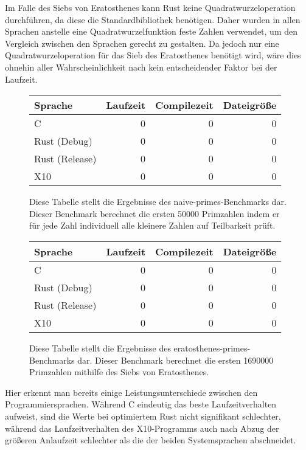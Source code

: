 Im Falle des Siebs von Eratosthenes kann Rust keine Quadratwurzeloperation durchführen, da diese die Standardbibliothek
benötigen. Daher wurden in allen Sprachen anstelle eine Quadratwurzelfunktion feste Zahlen verwendet, um den Vergleich
zwischen den Sprachen gerecht zu gestalten. Da jedoch nur eine Quadratwurzeloperation für das Sieb des Eratosthenes
benötigt wird, wäre dies ohnehin aller Wahrscheinlichkeit nach kein entscheidender Faktor bei der Laufzeit.

\begin{figure}[hb]
	\begin{center}
		\begin{tabular}{lrrr}
			\toprule
			Sprache & Laufzeit & Compilezeit & Dateigröße \\
			\midrule
			C & 0 & 0 & 0 \\
			Rust (Debug) & 0 & 0 & 0 \\
			Rust (Release) & 0 & 0 & 0 \\
			X10 & 0 & 0 & 0 \\
			\bottomrule
		\end{tabular}
	\end{center}
	\caption{
		Diese Tabelle stellt die Ergebnisse des naive-primes-Benchmarks dar. Dieser Benchmark berechnet die ersten 50000 Primzahlen
		indem er für jede Zahl individuell alle kleinere Zahlen auf Teilbarkeit prüft.
	}
	\label{fig:primes_naive_table}
\end{figure}

\begin{figure}[hb]
	\begin{center}
		\begin{tabular}{lrrr}
			\toprule
			Sprache & Laufzeit & Compilezeit & Dateigröße \\
			\midrule
			C & 0 & 0 & 0 \\
			Rust (Debug) & 0 & 0 & 0 \\
			Rust (Release) & 0 & 0 & 0 \\
			X10 & 0 & 0 & 0 \\
			\bottomrule
		\end{tabular}
	\end{center}
	\caption{
		Diese Tabelle stellt die Ergebnisse des eratosthenes-primes-Benchmarks dar. Dieser Benchmark berechnet die ersten 1690000
		Primzahlen mithilfe des Siebs von Eratosthenes.
	}
	\label{fig:primes_eratosthenes_table}
\end{figure}

Hier erkennt man bereits einige Leistungsunterschiede zwischen den Programmiersprachen. Während C eindeutig das
beste Laufzeitverhalten aufweist, sind die Werte bei optimiertem Rust nicht signifikant schlechter,
während das Laufzeitverhalten des X10-Programms auch nach Abzug der größeren Anlaufzeit schlechter
als die der beiden Systemsprachen abschneidet.


